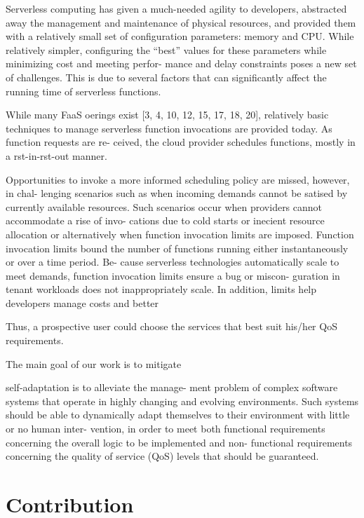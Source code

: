 \documentclass[12pt,a4paper]{report}
\begin{document}
Serverless computing has given a much-needed agility to
developers, abstracted away the management and maintenance
of physical resources, and provided them with a relatively
small set of conﬁguration parameters: memory and CPU.
While relatively simpler, conﬁguring the “best” values for
these parameters while minimizing cost and meeting perfor-
mance and delay constraints poses a new set of challenges.
This is due to several factors that can signiﬁcantly aﬀect the
running time of serverless functions.



While many FaaS oerings exist [3, 4, 10, 12, 15, 17, 18, 20],
relatively basic techniques to manage serverless function
invocations are provided today. As function requests are re-
ceived, the cloud provider schedules functions, mostly in
a rst-in-rst-out manner. 


Opportunities to invoke a more
informed scheduling policy are missed, however, in chal-
lenging scenarios such as when incoming demands cannot
be satised by currently available resources. Such scenarios
occur when providers cannot accommodate a rise of invo-
cations due to cold starts or inecient resource allocation
or alternatively when function invocation limits are imposed.
Function invocation limits bound the number of functions
running either instantaneously or over a time period. Be-
cause serverless technologies automatically scale to meet
demands, function invocation limits ensure a bug or miscon-
guration in tenant workloads does not inappropriately scale.
In addition, limits help developers manage costs and better


Thus, a prospective user
could choose the services that best suit his/her QoS
requirements.



The main goal of our work is to mitigate 

self-adaptation is to alleviate the manage-
ment problem of complex software systems that operate
in highly changing and evolving environments. Such
systems should be able to dynamically adapt themselves
to their environment with little or no human inter-
vention, in order to meet both functional requirements
concerning the overall logic to be implemented and non-
functional requirements concerning the quality of service
(QoS) levels that should be guaranteed.

\section{Contribution}
\end{document}
